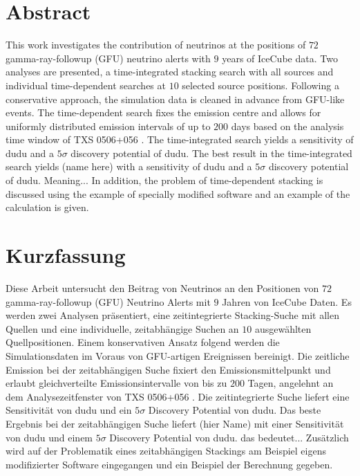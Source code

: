 \section*{Abstract}

This work investigates the contribution of neutrinos at the positions of $\num{72}$ gamma-ray-followup (GFU) neutrino alerts with $\num{9}$ years of IceCube data.
Two analyses are presented, a time-integrated stacking search with all sources and individual time-dependent searches at $\num{10}$ selected source positions.
Following a conservative approach, the simulation data is cleaned in advance from GFU-like events.
The time-dependent search fixes the emission centre and allows for uniformly distributed emission intervals of up to $\num{200}$ days based on the analysis time window of TXS 0506+056 \cite{txs}.
The time-integrated search yields a sensitivity of dudu and a $\num{5}\sigma$ discovery potential of dudu.
The best result in the time-integrated search yields (name here) with a sensitivity of dudu and a $\num{5}\sigma$ discovery potential of dudu.
Meaning...
In addition, the problem of time-dependent stacking is discussed using the example of specially modified software and an example of the calculation is given.

\section*{Kurzfassung}

Diese Arbeit untersucht den Beitrag von Neutrinos an den Positionen von $\num{72}$ gamma-ray-followup (GFU) Neutrino Alerts mit $\num{9}$ Jahren von IceCube Daten.
Es werden zwei Analysen präsentiert, eine zeitintegrierte Stacking-Suche mit allen Quellen und eine individuelle, zeitabhängige Suchen an $\num{10}$ ausgewählten Quellpositionen.
Einem konservativen Ansatz folgend werden die Simulationsdaten im Voraus von GFU-artigen Ereignissen bereinigt.
Die zeitliche Emission bei der zeitabhängigen Suche fixiert den Emissionsmittelpunkt und erlaubt gleichverteilte Emissionsintervalle von bis zu $\num{200}$ Tagen, angelehnt an dem Analysezeitfenster von TXS 0506+056 \cite{txs}
.
Die zeitintegrierte Suche liefert eine Sensitivität von dudu und ein $\num{5}\sigma$ Discovery Potential von dudu.
Das beste Ergebnis bei der zeitabhängigen Suche liefert (hier Name) mit einer Sensitivität von dudu und einem $\num{5}\sigma$ Discovery Potential von dudu.
das bedeutet...
Zusätzlich wird auf der Problematik eines zeitabhängigen Stackings am Beispiel eigens modifizierter Software eingegangen und ein Beispiel der Berechnung gegeben.
